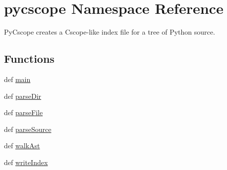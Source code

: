 \hypertarget{namespacepycscope}{\section{pycscope Namespace Reference}
\label{namespacepycscope}
}


Py\-Cscope creates a Cscope-\/like index file for a tree of Python source.  


\subsection*{Functions}
\begin{DoxyCompactItemize}
\item 
def \hyperlink{namespacepycscope_ae4431343d5d62eb7ed02d95a1d5e5c44}{main}
\item 
def \hyperlink{namespacepycscope_a99947671693538dcfcf13793ab76fdb7}{parse\-Dir}
\item 
def \hyperlink{namespacepycscope_a5e7fa06d83a19ded54d1bddacb6412b4}{parse\-File}
\item 
def \hyperlink{namespacepycscope_a63101a26deed43388f5054e000350533}{parse\-Source}
\item 
def \hyperlink{namespacepycscope_a15f2ee4f3a471258dc4d16834bb55be8}{walk\-Ast}
\item 
def \hyperlink{namespacepycscope_af02a9c3c4286c6b044e7bb6070c55b7d}{write\-Index}
\end{DoxyCompactItemize}
